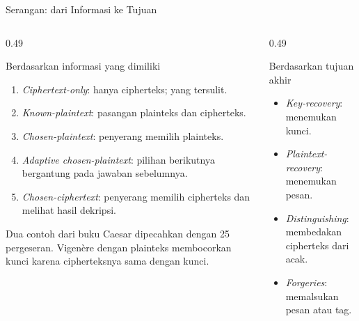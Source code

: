 \documentclass[aspectratio=169,11pt]{beamer}
\begin{document}
\begin{frame}{Serangan: dari Informasi ke Tujuan}
    \scriptsize
    \begin{columns}[T,onlytextwidth]
        \begin{column}{0.49\textwidth}
            \begin{block}{Berdasarkan informasi yang dimiliki}
                \begin{enumerate}
                    \setlength{\itemsep}{1pt}
                    \item \textit{Ciphertext-only}: hanya cipherteks; yang
                          tersulit.
                    \item \textit{Known-plaintext}: pasangan plainteks dan
                          cipherteks.
                    \item \textit{Chosen-plaintext}: penyerang memilih
                          plainteks.
                    \item \textit{Adaptive chosen-plaintext}: pilihan berikutnya
                          bergantung pada jawaban sebelumnya.
                    \item \textit{Chosen-ciphertext}: penyerang memilih
                          cipherteks dan melihat hasil dekripsi.
                \end{enumerate}
            \end{block}
            \begin{exampleblock}{Dua contoh dari buku}
                \footnotesize
                Caesar  dipecahkan dengan 25 pergeseran.
                Vigen\`ere dengan plainteks  membocorkan kunci
                karena cipherteksnya sama dengan kunci.
            \end{exampleblock}
        \end{column}
        \begin{column}{0.49\textwidth}
            \begin{block}{Berdasarkan tujuan akhir}
                \begin{itemize}
                    \setlength{\itemsep}{1pt}
                    \item \textit{Key-recovery}: menemukan kunci.
                    \item \textit{Plaintext-recovery}: menemukan pesan.
                    \item \textit{Distinguishing}: membedakan cipherteks dari
                          acak.
                    \item \textit{Forgeries}: memalsukan pesan atau tag.

\end{itemize}
\end{block}
\end{column}
\end{columns}
\end{frame}
\end{document}

